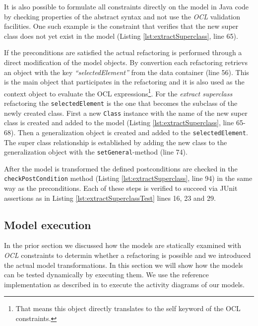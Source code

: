 \documentclass{llncs}
\begin{document}
It is also possible to formulate all constraints directly on the model in Java code by checking properties of the abstract 
syntax and not use the \textit{OCL} validation facilities. One such example is the constraint that verifies that the new super class does 
not yet exist in the model (Listing \ref{lst:extractSuperclass}, line 65).

If the preconditions are satisfied the actual refactoring is performed through a direct modification of the model objects. By
convertion each refactoring retrievs an object with the key \textit{``selectedElement''} from the data container (line 56). This is the 
main  object that participates in the refactoring and it is also used as the context object to evaluate the OCL expressions\footnote{That 
means this object directly translates to the self keyword of the OCL constraints.}. For the \textit{extract superclass} refactoring the
\texttt{selectedElement} is the one that becomes the subclass of the newly created class. First a new \texttt{Class} instance with the 
name of the new super class is created and added to the model (Listing \ref{lst:extractSuperclass}, line 65-68). Then a generalization 
object is created and added to the \texttt{selectedElement}. The super class relationship is established by adding the new class to 
the generalization object with the \texttt{setGeneral}-method (line 74).

After the model is transformed the defined postconditions are checked in the \texttt{checkPostCondition} method 
(Listing \ref{lst:extractSuperclass}, line 94) in the same way as the preconditions. Each of these steps is verified to succeed 
via JUnit assertions as in Listing \ref{lst:extractSuperclassTest} lines 16, 23 and 29.

\subsection{Model execution}
\label{sec:execution}
In the prior section we discussed how the models are statically examined with \textit{OCL} constraints to determin whether a refactoring 
is possible and we introduced the actual model transformations. In this section we will show how the models can be tested dynamically by 
executing them. We use the reference implementation as described in \cite{DBLP:conf/models/MayerhoferLK12} to execute the activity diagrams of 
our models.
\end{document}
